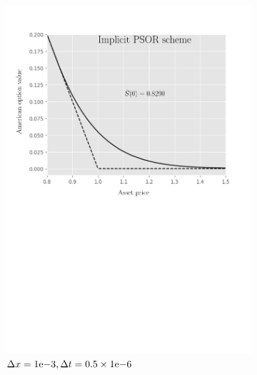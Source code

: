 \begin{figure}[H]
\begin{subfigure}{0.4\textwidth}
    \includegraphics[width=\textwidth]{chapters/chapter5/TestCase4ImplicitLCP.pdf}
    \caption{$\Delta{x}={1}\mathrm{e}{-3}, \Delta{t}=0.5\times{1}\mathrm{e}{-6}$}
    \label{fig:lcp:numericaresults:test_case_4_implicit}
  \end{subfigure}
  \hspace{0.5cm}
  \begin{subfigure}{0.4\textwidth}
    \label{fig:lcp:numericaresults:test_case_4_crank_nicholson}
    \centering

\end{subfigure}
\end{figure}
